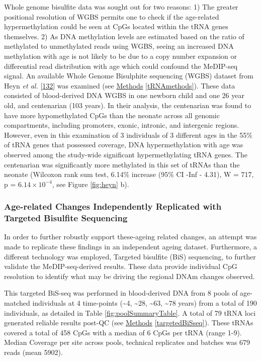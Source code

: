 \documentclass[
]{book}
\begin{document}
Whole genome bisulfite data was sought out for two reasons:
1) The greater positional resolution of WGBS permits one to check if the age-related hypermethylation could be seen at CpGs located within the tRNA genes themselves.
2) As DNA methylation levels are estimated based on the ratio of methylated to unmethylated reads using WGBS, seeing an increased DNA methylation with age is not likely to be due to a copy number expansion or differential read distribution with age which could confound the MeDIP-seq signal.
An available Whole Genome Bisulphite sequencing (WGBS) dataset from Heyn \emph{et al.} {[}\protect\hyperlink{ref-Heyn2012}{132}{]} was examined (see \protect\hyperlink{tRNAmethods}{Methods} \ref{tRNAmethods}).
These data consisted of blood-derived DNA WGBS in one newborn child and one 26 year old, and centenarian (103 years).
In their analysis, the centenarian was found to have more hypomethylated CpGs than the neonate across all genomic compartments, including promoters, exonic, intronic, and intergenic regions.
However, even in this examination of 3 individuals of 3 different ages in the 55\% of tRNA genes that possessed coverage, DNA hypermethylation with age was observed among the study-wide significant hypermethylating tRNA genes.
The centenarian was significantly more methylated in this set of tRNAs than the neonate (Wilcoxon rank sum test, 6.14\% increase (95\% CI -Inf - 4.31), W = 717, p = \(6.14\times10^{-4}\), see Figure \ref{fig:heyn} b).

\newpage

\hypertarget{age-related-changes-independently-replicated-with-targeted-bisulfite-sequencing}{%
\subsubsection{Age-related Changes Independently Replicated with Targeted Bisulfite Sequencing}\label{age-related-changes-independently-replicated-with-targeted-bisulfite-sequencing}}

In order to further robustly support these-ageing related changes, an attempt was made to replicate these findings in an independent ageing dataset.
Furthermore, a different technology was employed, Targeted bisulfite (BiS) sequencing, to further validate the MeDIP-seq-derived results.
These data provide individual CpG resolution to identify what may be driving the regional DNAm changes observed.

This targeted BiS-seq was performed in blood-derived DNA from 8 pools of age-matched individuals at 4 time-points (\textasciitilde4, \textasciitilde28, \textasciitilde63, \textasciitilde78 years) from a total of 190 individuals, as detailed in Table \ref{fig:poolSummaryTable}.
A total of 79 tRNA loci generated reliable results post-QC (see \protect\hyperlink{targetedBiSseq}{Methods} \ref{targetedBiSseq}).
These tRNAs covered a total of 458 CpGs with a median of 6 CpGs per tRNA (range 1-9).
Median Coverage per site across pools, technical replicates and batches was 679 reads (mean 5902).
\end{document}
